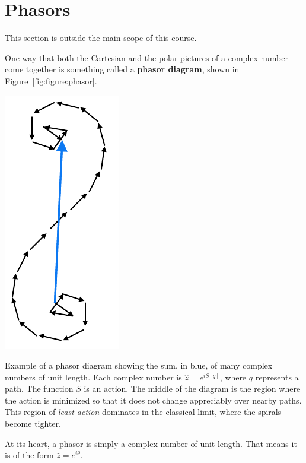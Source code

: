 \section{Phasors}

This section is outside the main scope of this course.

One way that both the Cartesian and the polar pictures of a complex number come together is something called a \textbf{phasor diagram}, shown in Figure~\ref{fig:figure:phasor}.
\begin{marginfigure}%
    \includegraphics[width=.5\textwidth]{figures/Phasor.pdf}
    \caption{Example of a phasor diagram showing the sum, in blue, of many complex numbers of unit length. Each complex number is $\hat z = e^{iS[q]}$, where $q$ represents a path. The function $S$ is an action. The middle of the diagram is the region where the action is minimized so that it does not change appreciably over nearby paths. This region of \emph{least action} dominates in the classical limit, where the spirals become tighter.}
    \label{fig:figure:phasor}
\end{marginfigure}
At its heart, a phasor is simply a complex number of unit length. That means it is of the form $\hat z = e^{i\theta}$. 
